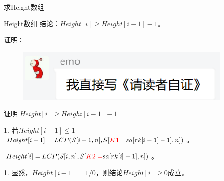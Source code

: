 \documentclass[usenames,dvipsnames]{ctexbeamer}		%
\begin{document}
\begin{frame}{求Height数组}
    
\begin{block}{Height数组}
结论：$Height[i] \geq Height[i-1] -1$。

证明：
\pause
\begin{figure}
    \centering
    \includegraphics[width=0.95\textwidth]{./emo.png}
\end{figure}

\end{block}    

\end{frame}

\begin{frame}{证明 $Height[i] \geq Height[i-1] -1$}
    
\begin{block}{1. 若$Height[i-1] \leq 1$}
$Height[i-1] = LCP(S[i-1, n], S[{\color{red}K1 =}sa[rk[i-1]-1], n])$。

$Height[i] = LCP(S[i, n], S[{\color{red}K2 = }sa[rk[i]-1], n])$。

1. 显然，$Height[i-1] = 1 / 0$，则结论$Height[i] \geq 0$成立。

\end{block}
\end{frame}
\end{document}
